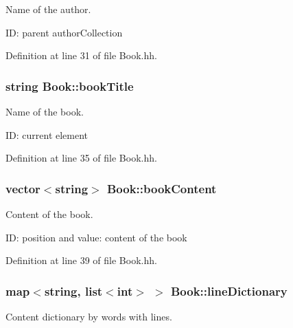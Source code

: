 Name of the author. 

ID\+: parent author\+Collection 

Definition at line 31 of file Book.\+hh.

\subsubsection[{\texorpdfstring{book\+Title}{bookTitle}}]{\setlength{\rightskip}{0pt plus 5cm}string Book\+::book\+Title\hspace{0.3cm}{\ttfamily [private]}}\hypertarget{class_book_a111d7b30bddd6166bd09764f050cfee3}{}\label{class_book_a111d7b30bddd6166bd09764f050cfee3}


Name of the book. 

ID\+: current element 

Definition at line 35 of file Book.\+hh.

\subsubsection[{\texorpdfstring{book\+Content}{bookContent}}]{\setlength{\rightskip}{0pt plus 5cm}vector$<$string$>$ Book\+::book\+Content\hspace{0.3cm}{\ttfamily [private]}}\hypertarget{class_book_a62ca3f4431b699fa41384c8bab7ef4fa}{}\label{class_book_a62ca3f4431b699fa41384c8bab7ef4fa}


Content of the book. 

ID\+: position and value\+: content of the book 

Definition at line 39 of file Book.\+hh.

\subsubsection[{\texorpdfstring{line\+Dictionary}{lineDictionary}}]{\setlength{\rightskip}{0pt plus 5cm}map$<$string, list$<$int$>$ $>$ Book\+::line\+Dictionary\hspace{0.3cm}{\ttfamily [private]}}\hypertarget{class_book_a7da5c2f5239458c2ab88576cac8d0a10}{}\label{class_book_a7da5c2f5239458c2ab88576cac8d0a10}


Content dictionary by words with lines. 


